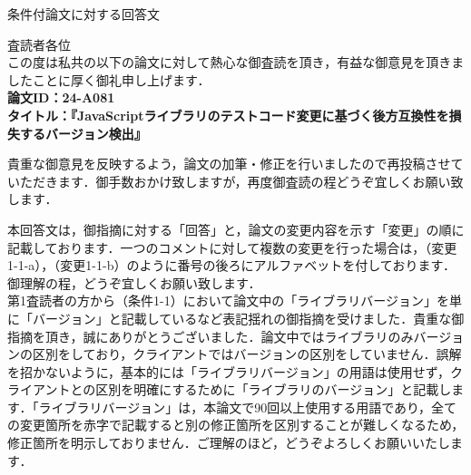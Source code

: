 \documentclass{jarticle} %
\def\restitle{条件付論文に対する回答文}
\begin{document}
{\Large \gt \restitle}

\vspace{3pc}

査読者各位\\


この度は私共の以下の論文に対して熱心な御査読を頂き，有益な御意見を頂きましたことに厚く御礼申し上げます．\\
\textbf{論文ID：24-A081}\\
\textbf{タイトル：『JavaScriptライブラリのテストコード変更に基づく後方互換性を損失するバージョン検出』}

貴重な御意見を反映するよう，論文の加筆・修正を行いましたので再投稿させていただきます．御手数おかけ致しますが，再度御査読の程どうぞ宜しくお願い致します．	

本回答文は，御指摘に対する「回答」と，論文の変更内容を示す「変更」の順に記載しております．一つのコメントに対して複数の変更を行った場合は，（変更1-1-a），（変更1-1-b）のように番号の後ろにアルファベットを付しております．御理解の程，どうぞ宜しくお願い致します．\\

第1査読者の方から（条件1-1）において論文中の「ライブラリバージョン」を単に「バージョン」と記載しているなど表記揺れの御指摘を受けました．貴重な御指摘を頂き，誠にありがとうございました．論文中ではライブラリのみバージョンの区別をしており，クライアントではバージョンの区別をしていません．誤解を招かないように，基本的には「ライブラリバージョン」の用語は使用せず，クライアントとの区別を明確にするために「ライブラリのバージョン」と記載します．「ライブラリバージョン」は，本論文で90回以上使用する用語であり，全ての変更箇所を赤字で記載すると別の修正箇所を区別することが難しくなるため，修正箇所を明示しておりません．ご理解のほど，どうぞよろしくお願いいたします．

\end{document}

